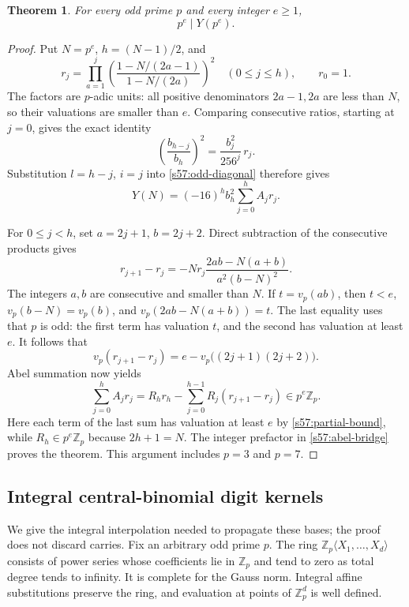 \documentclass[11pt,a4paper]{article}
\numberwithin{equation}{section}
\newtheorem{theorem}{Theorem}[section]
\theoremstyle{remark}
\begin{document}
\begin{theorem}
\label{s57:prime-power-bases}
For every odd prime \(p\) and every integer \(e\ge1\),
\[
                            p^e\mid Y(p^e).
\]
\end{theorem}
\begin{proof}
Put \(N=p^e\), \(h=(N-1)/2\), and
\[
 r_j=\prod_{a=1}^j
       \left(\frac{1-N/(2a-1)}{1-N/(2a)}\right)^2
       \quad(0\le j\le h),\qquad r_0=1.
\]
The factors are \(p\)-adic units: all positive denominators
\(2a-1,2a\) are less than \(N\), so their valuations are smaller
than \(e\). Comparing consecutive ratios, starting at \(j=0\), gives
the exact identity
\[
 \left(\frac{b_{h-j}}{b_h}\right)^2
                  =\frac{b_j^2}{256^j}\,r_j.
\]
Substitution \(l=h-j\), \(i=j\) into
\eqref{s57:odd-diagonal} therefore gives
\begin{equation}
 Y(N)=(-16)^h b_h^2\sum_{j=0}^h A_jr_j.
 \label{s57:abel-bridge}
\end{equation}

For \(0\le j<h\), set \(a=2j+1\), \(b=2j+2\). Direct subtraction
of the consecutive products gives
\[
 r_{j+1}-r_j
  =-N r_j\frac{2ab-N(a+b)}{a^2(b-N)^2}.
\]
The integers \(a,b\) are consecutive and smaller than \(N\).
If \(t=v_p(ab)\), then \(t<e\), \(v_p(b-N)=v_p(b)\), and
\(v_p(2ab-N(a+b))=t\). The last equality uses that \(p\) is odd:
the first term has valuation \(t\), and the second has valuation
at least \(e\). It follows that
\[
 v_p(r_{j+1}-r_j)
       =e-v_p\bigl((2j+1)(2j+2)\bigr).
\]
Abel summation now yields
\[
 \sum_{j=0}^h A_jr_j
   =R_hr_h-\sum_{j=0}^{h-1}R_j(r_{j+1}-r_j)\in p^e\mathbb Z_p.
\]
Here each term of the last sum has valuation at least \(e\) by
\eqref{s57:partial-bound}, while \(R_h\in p^e\mathbb Z_p\) because
\(2h+1=N\). The integer prefactor in \eqref{s57:abel-bridge} proves
the theorem. This argument includes \(p=3\) and \(p=7\).
\end{proof}

\subsection{Integral central-binomial digit kernels}

We give the integral interpolation needed to propagate these bases;
the proof does not discard carries. Fix an arbitrary odd prime \(p\).
The ring \(\mathbb Z_p\langle X_1,\ldots,X_d\rangle\) consists of
power series whose coefficients lie in \(\mathbb Z_p\) and tend to
zero as total degree tends to infinity. It is complete for the Gauss
norm. Integral affine substitutions preserve the ring, and evaluation
at points of \(\mathbb Z_p^d\) is well defined.
\end{document}
